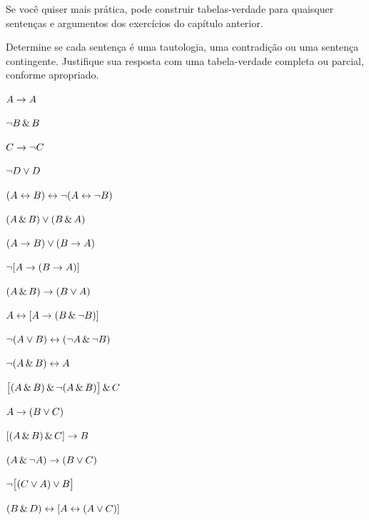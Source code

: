  








\practiceproblems
Se você quiser mais prática, pode construir tabelas-verdade para quaisquer sentenças e argumentos dos exercícios do capítulo anterior.

\solutions
\problempart
\label{pr.TT.TTorC}
Determine se cada sentença é uma tautologia, uma contradição ou uma sentença contingente. Justifique sua resposta com uma tabela-verdade completa ou parcial, conforme apropriado.
\begin{earg}
\item $A \rightarrow A$ %
\item $\neg B \,\&\, B$ %
\item $C \rightarrow\neg C$ %
\item $\neg D \vee D$ %
\item $(A \leftrightarrow B) \leftrightarrow \neg(A\leftrightarrow \neg B)$ %
\item $(A\,\&\, B) \vee (B\,\&\, A)$ %
\item $(A \rightarrow B) \vee (B \rightarrow A)$ %
\item $\neg[A \rightarrow (B \rightarrow A)]$ %
\item $(A \,\&\, B) \rightarrow (B \vee A)$  %
\item $A \leftrightarrow [A \rightarrow (B \,\&\, \neg B)]$ %
\item $\neg(A \vee B) \leftrightarrow (\neg A \,\&\, \neg B)$ %
\item $\neg(A\,\&\, B) \leftrightarrow A$ %
\item $\bigl[(A\,\&\, B) \,\&\,\neg(A\,\&\, B)\bigr] \,\&\, C$ %
\item $A\rightarrow(B\vee C)$ %
\item $[(A \,\&\, B) \,\&\, C] \rightarrow B$ %
\item $(A \,\&\,\neg A) \rightarrow (B \vee C)$ %
\item $\neg\bigl[(C\vee A) \vee B\bigr]$ %
\item $(B\,\&\, D) \leftrightarrow [A \leftrightarrow(A \vee C)]$%
\end{earg}


